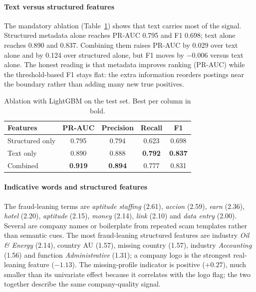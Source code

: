 \documentclass[10pt,journal,a4paper]{IEEEtran}
\begin{document}
\paragraph{Text versus structured features}
The mandatory ablation (Table~\ref{tab:ablation}) shows that text carries most
of the signal. Structured metadata alone reaches PR-AUC 0.795 and F1 0.698;
text alone reaches 0.890 and 0.837. Combining them raises PR-AUC by 0.029 over
text alone and by 0.124 over structured alone, but F1 moves by $-0.006$ versus
text alone. The honest reading is that metadata improves ranking (PR-AUC) while
the threshold-based F1 stays flat: the extra information reorders postings near
the boundary rather than adding many new true positives.

\begin{table}[t]
\centering
\caption{Ablation with LightGBM on the test set. Best per column in bold.}
\label{tab:ablation}
\footnotesize
\setlength{\tabcolsep}{3pt}
\begin{tabular}{@{}lcccc@{}}
\toprule
Features & PR-AUC & Precision & Recall & F1 \\
\midrule
Structured only & 0.795 & 0.794 & 0.623 & 0.698 \\
Text only & 0.890 & 0.888 & \textbf{0.792} & \textbf{0.837} \\
Combined & \textbf{0.919} & \textbf{0.894} & 0.777 & 0.831 \\
\bottomrule
\end{tabular}
\end{table}

\paragraph{Indicative words and structured features}
The fraud-leaning terms are \emph{aptitude staffing} (2.61), \emph{accion}
(2.59), \emph{earn} (2.36), \emph{hotel} (2.20), \emph{aptitude} (2.15),
\emph{money} (2.14), \emph{link} (2.10) and \emph{data entry} (2.00). Several
are company names or boilerplate from repeated scam templates rather than
semantic cues. The most fraud-leaning structured
features are industry \emph{Oil \& Energy} (2.14), country AU (1.57), missing
country (1.57), industry \emph{Accounting} (1.56) and function
\emph{Administrative} (1.31); a company logo is the strongest real-leaning
feature ($-1.13$). The missing-profile indicator is positive ($+0.27$), much
smaller than its univariate effect because it correlates with the logo flag;
the two together describe the same company-quality signal.
\end{document}
